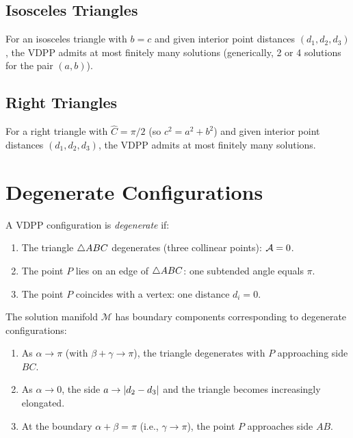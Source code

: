 \subsection{Isosceles Triangles}

\begin{theorem}
For an isosceles triangle with $b = c$ and given interior point distances $(d_1, d_2, d_3)$, the VDPP admits at most finitely many solutions (generically, 2 or 4 solutions for the pair $(a, b)$).
\end{theorem}

\subsection{Right Triangles}

\begin{theorem}
For a right triangle with $\hat{C} = \pi/2$ (so $c^2 = a^2 + b^2$) and given interior point distances $(d_1, d_2, d_3)$, the VDPP admits at most finitely many solutions.
\end{theorem}

\section{Degenerate Configurations}

\begin{definition}
A VDPP configuration is \emph{degenerate} if:
\begin{enumerate}[label=(\roman*)]
    \item The triangle $\triangle ABC$ degenerates (three collinear points): $\mathcal{A} = 0$.
    \item The point $P$ lies on an edge of $\triangle ABC$: one subtended angle equals $\pi$.
    \item The point $P$ coincides with a vertex: one distance $d_i = 0$.
\end{enumerate}
\end{definition}

\begin{theorem}
The solution manifold $\mathcal{M}$ has boundary components corresponding to degenerate configurations:
\begin{enumerate}[label=(\roman*)]
    \item As $\alpha \to \pi$ (with $\beta + \gamma \to \pi$), the triangle degenerates with $P$ approaching side $BC$.
    \item As $\alpha \to 0$, the side $a \to \left\lvert d_2 - d_3 \right\rvert$ and the triangle becomes increasingly elongated.
    \item At the boundary $\alpha + \beta = \pi$ (i.e., $\gamma \to \pi$), the point $P$ approaches side $AB$.
\end{enumerate}
\end{theorem}

